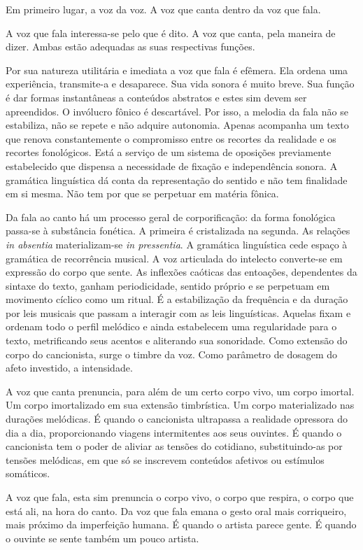 Em primeiro lugar, a voz da voz. A voz que canta dentro da voz que fala.

A voz que fala interessa-se pelo que é dito. A voz que canta, pela
maneira de dizer. Ambas estão adequadas as suas respectivas funções.

Por sua natureza utilitária e imediata a voz que fala é efêmera. Ela
ordena uma experiência, transmite-a e desaparece. Sua vida sonora é
muito breve. Sua função é dar formas instantâneas a conteúdos abstratos
e estes sim devem ser apreendidos. O invólucro fônico é descartável. Por
isso, a melodia da fala não se estabiliza, não se repete e não adquire
autonomia. Apenas acompanha um texto que renova constantemente o
compromisso entre os recortes da realidade e os recortes fonológicos.
Está a serviço de um sistema de oposições previamente estabelecido que
dispensa a necessidade de fixação e independência sonora. A gramática
linguística dá conta da representação do sentido e não tem finalidade em
si mesma. Não tem por que se perpetuar em matéria fônica.

Da fala ao canto há um processo geral de corporificação: da forma
fonológica passa-se à substância fonética. A primeira é cristalizada na
segunda. As relações \textit{in absentia} materializam-se \textit{in pressentia}. A
gramática linguística cede espaço à gramática de recorrência musical. A
voz articulada do intelecto converte-se em expressão do corpo que sente.
As inflexões caóticas das entoações, dependentes da sintaxe do texto,
ganham periodicidade, sentido próprio e se perpetuam em movimento
cíclico como um ritual. É a estabilização da frequência e da duração por
leis musicais que passam a interagir com as leis linguísticas. Aquelas
fixam e ordenam todo o perfil melódico e ainda estabelecem uma
regularidade para o texto, metrificando seus acentos e aliterando sua
sonoridade. Como extensão do corpo do cancionista, surge o timbre da
voz. Como parâmetro de dosagem do afeto investido, a intensidade.

A voz que canta prenuncia, para além de um certo corpo vivo, um corpo
imortal. Um corpo imortalizado em sua extensão timbrística. Um corpo
materializado nas durações melódicas. É quando o cancionista ultrapassa
a realidade opressora do dia a dia, proporcionando viagens intermitentes
aos seus ouvintes. É quando o cancionista tem o poder de aliviar as
tensões do cotidiano, substituindo-as por tensões melódicas, em que só
se inscrevem conteúdos afetivos ou estímulos somáticos.

A voz que fala, esta sim prenuncia o corpo vivo, o corpo que respira, o
corpo que está ali, na hora do canto. Da voz que fala emana o gesto oral
mais corriqueiro, mais próximo da imperfeição humana. É quando o artista
parece gente. É quando o ouvinte se sente também um pouco artista.

